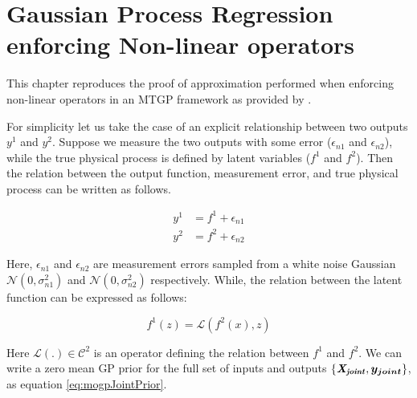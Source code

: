 \chapter{Gaussian Process Regression enforcing Non-linear operators}\label{appNonLinear}
This chapter reproduces the proof of approximation performed when enforcing non-linear operators in an MTGP framework as provided by \cite{Constantinescu2013}.

For simplicity let us take the case of an explicit relationship between two outputs \(y^{1}\) and \(y^{2}\). Suppose we measure the two outputs with some error ($\epsilon_{n1}$ and $\epsilon_{n2}$), while the true physical process is defined by latent variables (\(f^{1}\) and \(f^{2}\)). Then the relation between the output function, measurement error, and true physical process can be written as follows. 

\begin{align} 
y^{1} & = f^{1} + \epsilon_{n1} \\
y^{2} & = f^{2} + \epsilon_{n2}
\end{align} 

Here, \(\epsilon_{n1}\) and \(\epsilon_{n2}\) are measurement errors sampled from a white noise Gaussian \(\mathcal{N}(0, \sigma_{n1}^2)\) and \(\mathcal{N}(0, \sigma_{n2}^2)\) respectively. While, the relation between the latent function can be expressed as follows:

\begin{equation}\label{eqOperation}
    f^{1}(z) = \mathcal{L}\left ( f^{2}(x), z \right )
\end{equation}

Here \(\mathcal{L} \left ( . \right ) \in \mathcal{C}^{2}\) is an operator defining the relation between \(f^{1}\) and \(f^{2}\). We can write a zero mean GP prior for the full set of inputs and outputs $\{\bm{\mathit{X_{joint}}}, \boldsymbol{y_{joint}}\}$, as equation \ref{eq:mogpJointPrior}. 

